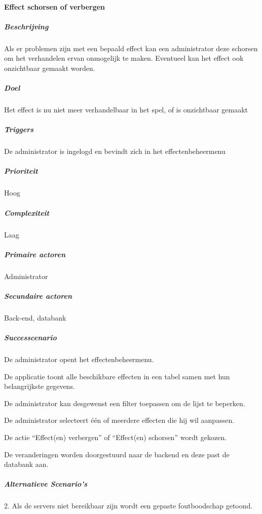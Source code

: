 \paragraph{Effect schorsen of verbergen}
\begin{compact}
\subparagraph{Beschrijving} Als er problemen zijn met een bepaald effect kan een administrator deze schorsen om het verhandelen ervan onmogelijk te maken. Eventueel kan het effect ook onzichtbaar gemaakt worden.
\subparagraph{Doel} Het effect is nu niet meer verhandelbaar in het spel, of is onzichtbaar gemaakt
\subparagraph{Triggers}De administrator is ingelogd en bevindt zich in het effectenbeheermenu
\subparagraph{Prioriteit}Hoog
\subparagraph{Complexiteit}Laag
\subparagraph{Primaire actoren}Administrator
\subparagraph{Secundaire actoren}Back-end, databank
\subparagraph{Successcenario}
\begin{enumerate_compact}
 \item De administrator opent het effectenbeheermenu.
 \item De applicatie toont alle beschikbare effecten in een tabel samen met hun belangrijkste gegevens.
 \item De administrator kan desgewenst een filter toepassen om de lijst te beperken.
 \item De administrator selecteert \'e\'en of meerdere effecten die hij wil aanpassen.
 \item De actie ``Effect(en) verbergen'' of ``Effect(en) schorsen'' wordt gekozen.
 \item De veranderingen worden doorgestuurd naar de backend en deze past de databank aan.
\end{enumerate_compact}
\subparagraph{Alternatieve Scenario's}
\begin{enumerate_compact}
	\item[2.] Als de servers niet bereikbaar zijn wordt een gepaste foutboodschap getoond.
\end{enumerate_compact}
\end{compact}

